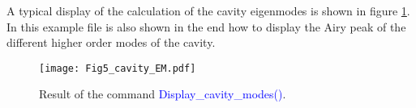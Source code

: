 A typical display of the calculation of the cavity eigenmodes is shown in figure \ref{fig5:cav_EM}.  In this example file is also shown in the end how to display the Airy peak of the different higher order modes of the cavity.

\begin{figure}
\begin{center}
\texttt{[image: Fig5\_cavity\_EM.pdf]}\hfill
\end{center}
\caption{\label{fig5:cav_EM} Result of the command \textcolor{blue}{Display\_cavity\_modes()}.}
\end{figure}

